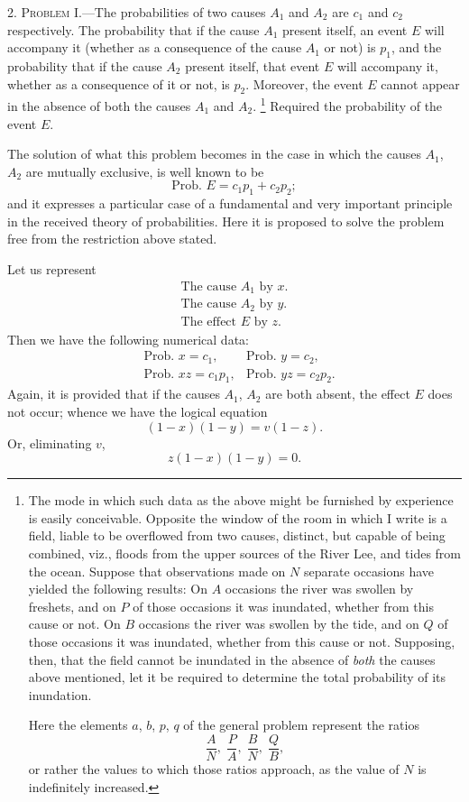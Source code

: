 \documentclass[oneside]{book}
\begin{document}
2. \textsc{Problem I.}---The probabilities of two causes $A_1$ and $A_2$
are $c_1$ and $c_2$ respectively. The probability that if the cause $A_1$
present itself, an event $E$ will accompany it (whether as a consequence of the cause $A_1$ or not) is $p_1$, and the probability that if
the cause $A_2$ present itself, that event $E$ will accompany it,
whether as a consequence of it or not, is $p_2$. Moreover, the
event $E$ cannot appear in the absence of both the causes $A_1$ and
$A_2$.
%
\footnote{The mode in which such data as the above might be furnished by experience is easily conceivable. Opposite the window of the room in which I write
is a field, liable to be overflowed from two causes, distinct, but capable of being
combined, viz., floods from the upper sources of the River Lee, and tides from
the ocean. Suppose that observations made on $N$ separate occasions have
yielded the following results: On $A$ occasions the river was swollen by freshets,
and on $P$ of those occasions it was inundated, whether from this cause or not.
On $B$ occasions the river was swollen by the tide, and on $Q$ of those occasions it
was inundated, whether from this cause or not. Supposing, then, that the field
cannot be inundated in the absence of \emph{both} the causes above mentioned, let it be
required to determine the total probability of its inundation.

Here the elements $a$, $b$, $p$, $q$ of the general problem represent the ratios
\[
  \frac{A}{N},\; \frac{P}{A},\; \frac{B}{N},\; \frac{Q}{B},
\]
or rather the values to which those ratios approach, as the value of $N$ is indefinitely increased.} %
%
Required the probability of the event $E$.

The solution of what this problem becomes in the case in
which the causes $A_1$, $A_2$ are mutually exclusive, is well known
to be
\[
  \text{Prob. }E = c_1p_1 + c_2p_2;
\]
and it expresses a particular case of a fundamental and very important principle in the received theory of probabilities. Here
it is proposed to solve the problem free from the restriction above
stated.

Let us represent
\[\begin{array}{l}
  \text{The cause }  A_1 \text{ by } x.\\
  \text{The cause }  A_2 \text{ by } y.\\
  \text{The effect } E   \text{ by } z.
\end{array}\]
Then we have the following numerical data:
\begin{align*}
  &\text{Prob. }x = c_1,     &\text{Prob. }y = c_2,   \\
  &\text{Prob. }xz = c_1p_1, &\text{Prob. }yz = c_2p_2.  \tag{1}
\end{align*}
Again, it is provided that if the causes $A_1$, $A_2$ are both absent, the effect $E$ does not occur; whence we have the logical
equation
\[
  (1-x)(1-y) = v(1-z).
\]
Or, eliminating $v$,
\[
  z(1-x)(1-y) = 0.   \tag{2}
\]
\end{document}
